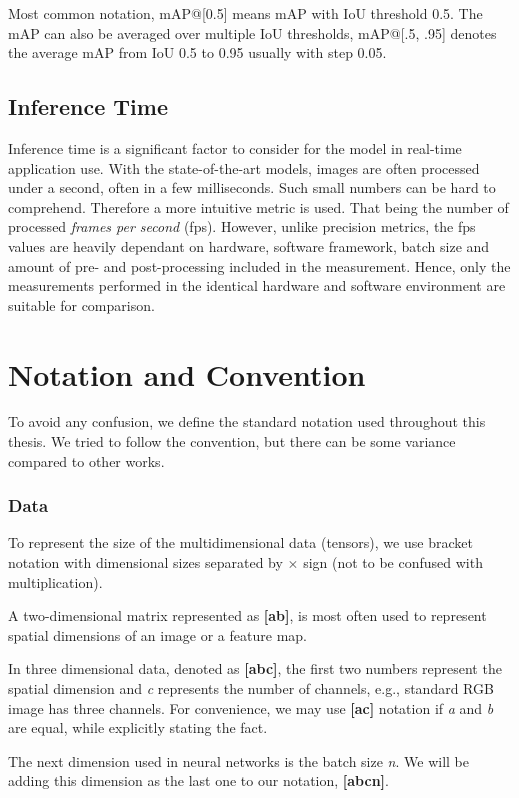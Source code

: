 Most common notation, mAP@[0.5] means mAP with IoU threshold 0.5. The mAP can also be averaged over multiple IoU thresholds, mAP@[.5, .95] denotes the average mAP from IoU 0.5 to 0.95 usually with step 0.05.

\subsection{Inference Time}
Inference time is a significant factor to consider for the model in real-time application use. With the state-of-the-art models, images are often processed under a second, often in a few milliseconds. Such small numbers can be hard to comprehend. Therefore a more intuitive metric is used. That being the number of processed \textit{frames per second} (fps). However, unlike precision metrics, the fps values are heavily dependant on hardware, software framework, batch size and amount of pre- and post-processing included in the measurement. Hence, only the measurements performed in the identical hardware and software environment are suitable for comparison.

\section{Notation and Convention}
\label{sec:notation}
To avoid any confusion, we define the standard notation used throughout this thesis. We tried to follow the convention, but there can be some variance compared to other works.

\subsubsection*{Data}

To represent the size of the multidimensional data (tensors), we use bracket notation with dimensional sizes separated by $\times $ sign (not to be confused with multiplication).

A two-dimensional matrix represented as \textbf{[a\x b]}, is most often used to represent spatial dimensions of an image or a feature map. 

In three dimensional data, denoted as \textbf{[a\x b\x c]}, the first two numbers represent the spatial dimension and \textit{c} represents the number of channels, e.g., standard RGB image has three channels. For convenience, we may use \textbf{[a\x c]} notation if \textit{a} and \textit{b} are equal, while explicitly stating the fact.

The next dimension used in neural networks is the batch size \textit{n}. We will be adding this dimension as the last one to our notation, \textbf{[a\x b\x c\x n]}.

